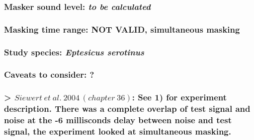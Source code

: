 \documentclass[11pt]{article}
\begin{document}
\hypertarget{masker-sound-level-to-be-calculated-1}{%
\subsubsection{\texorpdfstring{Masker sound level: \emph{to be
calculated}}{Masker sound level: to be calculated}}\label{masker-sound-level-to-be-calculated-1}}

\hypertarget{masking-time-range-not-valid-simultaneous-masking-1}{%
\subsubsection{Masking time range: NOT VALID, simultaneous
masking}\label{masking-time-range-not-valid-simultaneous-masking-1}}

\hypertarget{study-species-eptesicus-serotinus-1}{%
\subsubsection{\texorpdfstring{Study species: \emph{Eptesicus
serotinus}}{Study species: Eptesicus serotinus}}\label{study-species-eptesicus-serotinus-1}}

\hypertarget{caveats-to-consider-1}{%
\subsubsection{Caveats to consider: ?}\label{caveats-to-consider-1}}

\hypertarget{siewert-et-al.-2004-chapter-36-see-1-for-experiment-description.-there-was-a-complete-overlap-of-test-signal-and-noise-at-the--6-millisconds-delay-between-noise-and-test-signal-the-experiment-looked-at-simultaneous-masking.}{%
\subsubsection{\texorpdfstring{\textgreater{}
\href{http://press.uchicago.edu/ucp/books/book/chicago/E/bo3612864.html}{\(Siewert\ et\ al.\ 2004\, (chapter\ 36)\)}:
See 1) for experiment description. There was a complete overlap of test
signal and noise at the -6 millisconds delay between noise and test
signal, the experiment looked at simultaneous
masking.}{\textgreater{} Siewert\textbackslash{} et\textbackslash{} al.\textbackslash{} 2004\textbackslash{}, (chapter\textbackslash{} 36): See 1) for experiment description. There was a complete overlap of test signal and noise at the -6 millisconds delay between noise and test signal, the experiment looked at simultaneous masking.}}\label{siewert-et-al.-2004-chapter-36-see-1-for-experiment-description.-there-was-a-complete-overlap-of-test-signal-and-noise-at-the--6-millisconds-delay-between-noise-and-test-signal-the-experiment-looked-at-simultaneous-masking.}}
\end{document}
